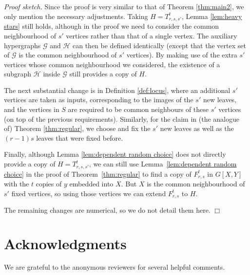 \documentclass[11pt]{article}
\numberwithin{equation}{section}
\theoremstyle{definition}
\begin{document}
\noindent \emph{Proof sketch.} Since the proof is very similar to that of Theorem \ref{thm:main2},  we only mention the necessary adjustments. Taking $H=T_{r,s,s'}^t$, Lemma \ref{lem:heavy stars} still holds, although in the proof we need to consider the common neighbourhood of $s'$ vertices rather than that of a single vertex. The auxiliary hypergraphs $\mathcal{G}$ and $\mathcal{H}$ can then be defined identically (except that the vertex set of $\mathcal{G}$ is the common neighbourhood of $s'$ vertices). By making use of the extra $s'$ vertices whose common neighbourhood we considered, the existence of a subgraph $\mathcal{H}$ inside $\mathcal{G}$ still provides a copy of $H$.

The next substantial change is in Definition \ref{def:locus}, where an additional $s'$ vertices are taken as inputs, corresponding to the images of the $s'$ new leaves, and the vertices in $S$ are required to be common neighbours of these $s'$ vertices (on top of the previous requirements). Similarly, for the claim in (the analogue of) Theorem \ref{thm:regular}, we choose and fix the $s'$ new leaves as well as the $(r-1)s$ leaves that were fixed before.

Finally, although Lemma \ref{lem:dependent random choice} does not directly provide a copy of $H=T_{r,s,s'}^t$, we can still use Lemma~\ref{lem:dependent random choice} in the proof of Theorem~\ref{thm:regular} to find a copy of $F_{r,s}^t$ in $G[X,Y]$ with the $t$ copies of $y$ embedded into $X$. But $X$ is the common neighbourhood of $s'$ fixed vertices, so using those vertices we can extend $F_{r,s}^t$ to $H$.

The remaining changes are numerical, so we do not detail them here. \hfill $\Box$



\section*{Acknowledgments} %
We are grateful to the anonymous reviewers for several helpful comments.
\end{document}

